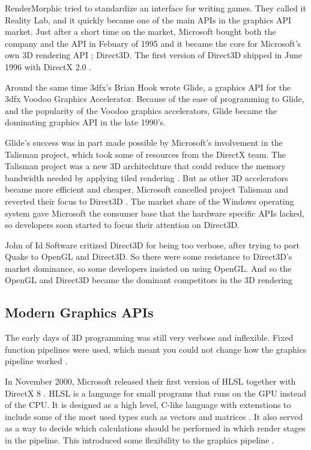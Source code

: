 RenderMorphic tried to standardize an interface for writing games.
They called it Reality Lab, and it quickly became one of the main \glspl{API} in the graphics \gls{API} market. 
Just after a short time on the market, Microsoft bought both the company and the \gls{API} in Febuary of 1995 and it became the core for Microsoft's own 3D rendering \gls{API} \cite{1997crushed}; Direct3D.
The first version of Direct3D shipped in June 1996 with DirectX 2.0 \cite{wikipedia????directx}. 

Around the same time 3dfx's Brian Hook wrote Glide, a graphics API for the 3dfx Voodoo Graphics Accelerator.
Because of the ease of programming to Glide, and the popularity of the Voodoo graphics accelerators, Glide became the dominating graphics \gls{API} in the late 1990's.

Glide's success was in part made possible by Microsoft's involvement in the Talisman project, which took some of resources from the DirectX team.
The Talisman project was a new 3D architechture that could reduce the memory bandwidth needed by applying tiled rendering \cite{torborg1996talisman}.
But as other 3D accelerators became more efficient and cheaper, Microsoft cancelled project Talisman and reverted their focus to Direct3D \cite{wikipedia????talisman}.
The market share of the Windows operating system gave Microsoft the consumer base that the hardware specific \glspl{API} lacked, so developers soon started to focus their attention on Direct3D.

John \citet{carmack1996plan} of Id Software critized Direct3D for being too verbose, after trying to port Quake to OpenGL and Direct3D.
So there were some resistance to Direct3D's market dominance, so some developers insisted on using OpenGL.
And so the OpenGL and Direct3D became the dominant competitors in the 3D rendering 

\subsection{Modern Graphics \acs{API}s}

The early days of 3D programming was still very verbose and inflexible. 
Fixed function pipelines were used, which meant you could not change how the graphics pipeline worked \cite{davidovic2014fixedfunction}.

In November 2000, Microsoft released their first version of \gls{HLSL} together with DirectX 8 \cite{wikipedia????directx}.
\Gls{HLSL} is a language for small programs that runs on the \gls{GPU} instead of the \gls{CPU}.
It is designed as a high level, C-like language with extenstions to include some of the most used types such as vectors and matrices \cite{microsoft????hlsl}.
It also served as a way to decide which calculations should be performed in which render stages in the pipeline.
This introduced some flexibility to the graphics pipeline .

